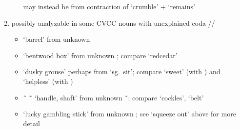 \begin{morphdesc}[resume*=alphalist]
\begin{enumerate}
\begin{itemize}
			may instead be from contraction of  ‘crumble’ +
				 ‘remains’
		\end{itemize}
	\item	possibly analyzable in some CVCC nouns with unexplained coda //
		\begin{itemize}
		\item	{} ‘barrel’
			from unknown 
		\item	{} ‘bentwood box’
			from unknown ;
			compare  ‘redcedar’
		\item	{} ‘dusky grouse’
			perhaps from  ‘sg.\ sit’;
			compare  ‘sweet’ (with )
			and  ‘helpless’ (with )
		\item	{} \~\  \~\  ‘handle, shaft’
			from unknown  \~\ ;
			compare  ‘cockles’,
			 ‘belt’
		\item	{} ‘lucky gambling stick’
			from unknown ;
			see  ‘squeeze out’ above for more detail
		\end{itemize}
	\end{enumerate}


\end{morphdesc}
